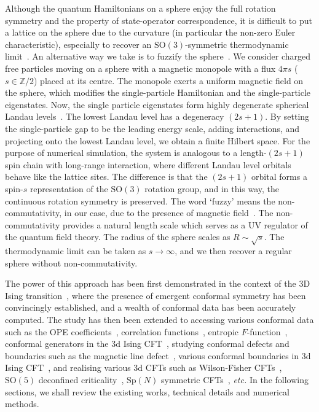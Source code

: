 \documentclass{timesjhep}
\begin{document}
Although the quantum Hamiltonians on a sphere enjoy the full rotation symmetry and the property of state-operator correspondence, it is difficult to put a lattice on the sphere due to the curvature (in particular the non-zero Euler characteristic), especially to recover an $\mathrm{SO}(3)$-symmetric thermodynamic limit~\cite{Brower2024Sphere}. An alternative way we take is to fuzzify the sphere~\cite{Madore1991Fuzzy}. We consider charged free particles moving on a sphere with a magnetic monopole with a flux $4\pi s$ ($s\in\mathbb{Z}/2$) placed at its centre. The monopole exerts a uniform magnetic field on the sphere, which modifies the single-particle Hamiltonian and the single-particle eigenstates. Now, the single particle eigenstates form highly degenerate spherical Landau levels~\cite{Haldane1983LLL,Wu1976LLL,Greiter2011LLL,Hasebe2010LLL}. The lowest Landau level has a degeneracy $(2s+1)$. By setting the single-particle gap to be the leading energy scale, adding interactions, and projecting onto the lowest Landau level, we obtain a finite Hilbert space. For the purpose of numerical simulation, the system is analogous to a length-$(2s+1)$ spin chain with long-range interaction, where different Landau level orbitals behave like the lattice sites. The difference is that the $(2s+1)$ orbital forms a spin-$s$ representation of the $\mathrm{SO}(3)$ rotation group, and in this way, the continuous rotation symmetry is preserved. The word `fuzzy' means the non-commutativity, in our case, due to the presence of magnetic field~\cite{Madore1991Fuzzy,Hasebe2010LLL}. The non-commutativity provides a natural length scale which serves as a UV regulator of the quantum field theory. The radius of the sphere scales as $R\sim\sqrt s$. The thermodynamic limit can be taken as $s\to\infty$, and we then recover a regular sphere without non-commutativity. 

The power of this approach has been first demonstrated in the context of the 3D Ising transition~\cite{Zhu2022}, where the presence of emergent conformal symmetry has been convincingly established, and a wealth of conformal data has been accurately computed. The study has then been extended to accessing various conformal data such as the OPE coefficients~\cite{Hu2023Mar}, correlation functions~\cite{Han2023Jun}, entropic $F$-function~\cite{Hu2024}, conformal generators in the 3d Ising CFT~\cite{Fardelli2024,Fan2024}, studying conformal defects and boundaries such as the magnetic line defect~\cite{Hu2023Aug,Zhou2024Jan}, various conformal boundaries in 3d Ising CFT~\cite{Zhou2024Jul,Dedushenko2024}, and realising various 3d CFTs such as Wilson-Fisher CFTs~\cite{Han2023Dec}, $\mathrm{SO}(5)$ deconfined criticality~\cite{Zhou2023}, $\mathrm{Sp}(N)$ symmetric CFTs~\cite{Zhou2024Oct}, \textit{etc.} In the following sections, we shall review the existing works, technical details and numerical methods. 
\end{document}
